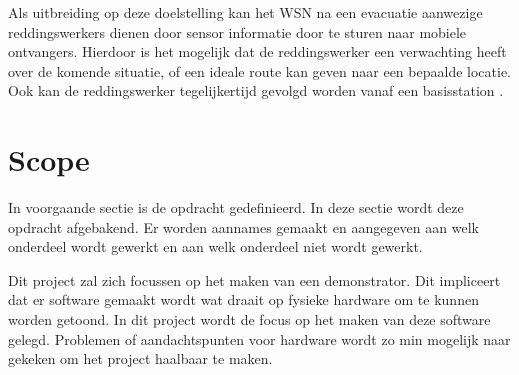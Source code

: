\documentclass{../local}
\begin{document}
Als uitbreiding op deze doelstelling kan het WSN na een evacuatie aanwezige reddingswerkers dienen door sensor informatie door te sturen naar mobiele ontvangers. Hierdoor is het mogelijk dat de reddingswerker een verwachting heeft over de komende situatie, of een ideale route kan geven naar een bepaalde locatie. Ook kan de reddingswerker tegelijkertijd gevolgd worden vanaf een basisstation \cite{ShaWSN}.

\section{Scope}
In voorgaande sectie is de opdracht gedefinieerd. In deze sectie wordt deze opdracht afgebakend. Er worden aannames gemaakt en aangegeven aan welk onderdeel wordt gewerkt en aan welk onderdeel niet wordt gewerkt.

Dit project zal zich focussen op het maken van een demonstrator. Dit impliceert dat er software gemaakt wordt wat draait op fysieke hardware om te kunnen worden getoond. In dit project wordt de focus op het maken van deze software gelegd. Problemen of aandachtspunten voor hardware wordt zo min mogelijk naar gekeken om het project haalbaar te maken.
\end{document}
